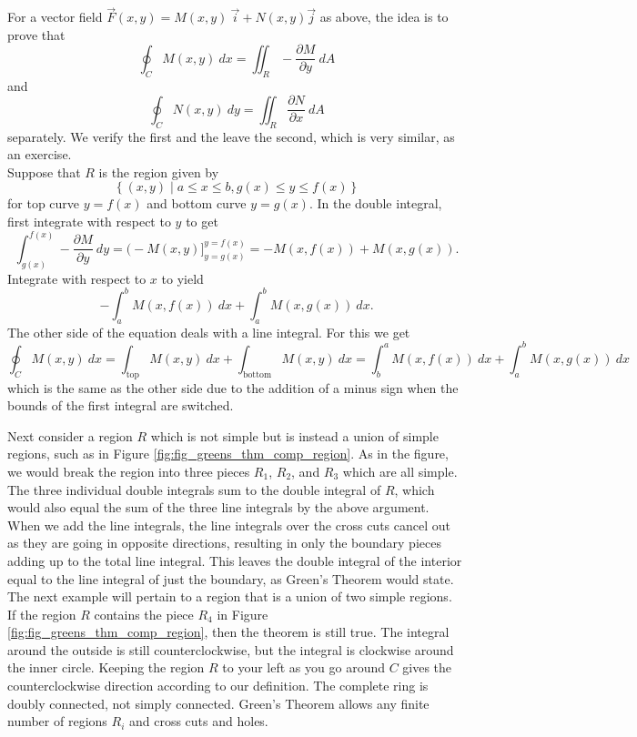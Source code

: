 For a vector field $\vec F(x,y) = M(x,y) \: \vec i + N(x,y) \vec j$ as above, the idea is to prove that
$$\oint_C M(x,y) \: dx = \iint_R -\dfrac{\partial M}{\partial y} \: dA$$
and
$$\oint_C N(x,y) \: dy = \iint_R \dfrac{\partial N}{\partial x} \: dA$$
separately. We verify the first and the leave the second, which is very similar, as an exercise.\\

Suppose that $R$ is the region given by
$$\left\{ (x,y) \mid a \leq x \leq b, g(x) \leq y \leq f(x) \right\}$$
for top curve $y = f(x)$ and bottom curve $y = g(x)$.  In the double integral, first integrate with respect to $y$ to get
$$\int_{g(x)}^{f(x)} -\dfrac{\partial M}{\partial y} \: dy = \Big( -M(x,y) \Big]_{y=g(x)}^{y=f(x)} = -M(x,f(x)) + M(x,g(x)).$$
Integrate with respect to $x$ to yield
$$-\int_a^b M(x,f(x)) \: dx + \int_a^b M(x,g(x)) \: dx.$$
The other side of the equation deals with a line integral. For this we get
$$\oint_C M(x,y) \: dx = \int_{\text{top}} M(x,y) \: dx + \int_{\text{bottom}} M(x,y) \: dx = \int_b^a M(x,f(x)) \: dx + \int_a^b M(x,g(x)) \: dx$$
which is the same as the other side due to the addition of a minus sign when the bounds of the first integral are switched.\\


Next consider a region $R$ which is not simple but is instead a union of simple regions, such as in Figure \ref{fig:fig_greens_thm_comp_region}. As in the figure, we would break the region into three pieces $R_1$, $R_2$, and $R_3$ which are all simple. The three individual double integrals sum to the double integral of $R$, which would also equal the sum of the three line integrals by the above argument. When we add the line integrals, the line integrals over the cross cuts cancel out as they are going in opposite directions, resulting in only the boundary pieces adding up to the total line integral.  This leaves the double integral of the interior equal to the line integral of just the boundary, as Green's Theorem would state. The next example will pertain to a region that is a union of two simple regions. \\

If the region $R$ contains the piece $R_4$ in Figure \ref{fig:fig_greens_thm_comp_region}, then the theorem is still true. The
integral around the outside is still counterclockwise, but the integral is clockwise around the inner circle. Keeping the region $R$ to your left as you go around $C$ gives the counterclockwise direction according to our definition. The complete ring is doubly connected, not simply connected. Green's Theorem allows any finite number of regions $R_i$ and cross cuts and holes.\\

